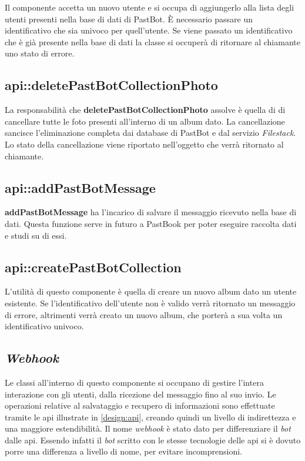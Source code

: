 Il componente accetta un nuovo utente e si occupa di aggiungerlo alla lista
degli utenti presenti nella base di dati di PastBot. È necessario passare un
identificativo che sia univoco per quell'utente. Se viene passato un
identificativo che è già presente nella base di dati la classe si occuperà di
ritornare al chiamante uno stato di errore.

\subsection{api::deletePastBotCollectionPhoto}

La responsabilità che \textbf{deletePastBotCollectionPhoto} assolve è quella di
di cancellare tutte le foto presenti all'interno di un album dato. La
cancellazione sancisce l'eliminazione completa dai database di PastBot e dal
servizio \textit{Filestack}.
Lo stato della cancellazione viene riportato nell'oggetto che verrà ritornato
al chiamante.

\subsection{api::addPastBotMessage}

\textbf{addPastBotMessage} ha l'incarico di salvare il messaggio ricevuto nella
base di dati. Questa funzione serve in futuro a PastBook per poter eseguire
raccolta dati e studi su di essi.

\subsection{api::createPastBotCollection}

L'utilità di questo componente è quella di creare un nuovo album dato un
utente esistente. Se l'identificativo dell'utente non è valido verrà ritornato
un messaggio di errore, altrimenti verrà creato un nuovo album, che porterà a
sua volta un identificativo univoco.

\subsection{\textit{Webhook}}

Le classi all'interno di questo componente si occupano di gestire l'intera
interazione con gli utenti, dalla ricezione del messaggio fino al suo invio. Le
operazioni relative al salvataggio e recupero di informazioni sono effettuate
tramite le \gls{api} illustrate in \ref{design:api}, creando quindi un livello
di indirettezza e una maggiore estendibilità.
Il nome \textit{webhook} è stato dato per differenziare il \textit{bot} dalle
\gls{api}. Essendo infatti il \textit{bot} scritto con le stesse tecnologie
delle \gls{api} si è dovuto porre una differenza a livello di nome, per evitare
incomprensioni.


